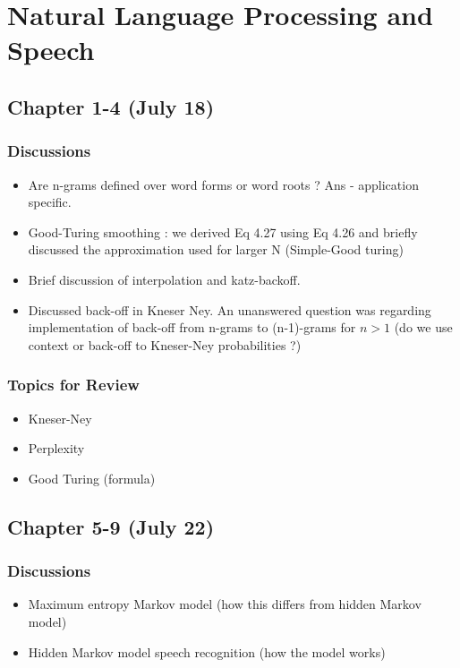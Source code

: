 \section{Natural Language Processing and Speech}

\subsection{Chapter 1-4 (July 18)}

\subsubsection*{Discussions}
\begin{itemize}
\item Are n-grams defined over word forms or word roots ? Ans - application specific.
\item Good-Turing smoothing : we derived Eq 4.27 using Eq 4.26 and briefly discussed the approximation used for larger N (Simple-Good turing)
\item Brief discussion of interpolation and katz-backoff.
\item Discussed back-off in Kneser Ney. An unanswered question was regarding implementation of back-off from n-grams to (n-1)-grams for $n > 1$ (do we use context or back-off to Kneser-Ney probabilities ?)
\end{itemize}

\subsubsection*{Topics for Review}
\begin{itemize}
\item Kneser-Ney
\item Perplexity
\item Good Turing (formula)
\end{itemize}

\subsection{Chapter 5-9 (July 22)}

\subsubsection*{Discussions}
\begin{itemize}
\item Maximum entropy Markov model (how this differs from hidden Markov model)
\item Hidden Markov model speech recognition (how the model works)
\end{itemize}

